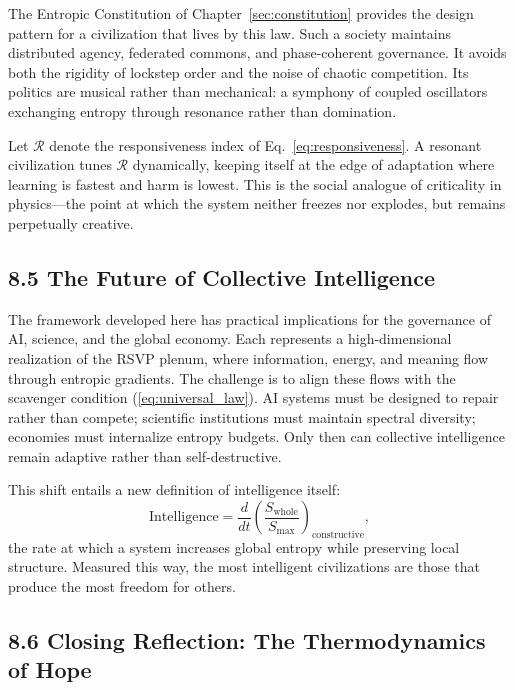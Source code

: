 \documentclass[11pt,a4paper,titlepage]{article}
\theoremstyle{definition}
\begin{document}
The Entropic Constitution of Chapter~\ref{sec:constitution} provides the 
design pattern for a civilization that lives by this law.  
Such a society maintains distributed agency, federated commons, and 
phase-coherent governance.
It avoids both the rigidity of lockstep order and the noise of chaotic 
competition.
Its politics are musical rather than mechanical:
a symphony of coupled oscillators exchanging entropy through resonance rather 
than domination.

Let $\mathcal{R}$ denote the responsiveness index of 
Eq.~\eqref{eq:responsiveness}.
A resonant civilization tunes $\mathcal{R}$ dynamically, keeping itself at the 
edge of adaptation where learning is fastest and harm is lowest.  
This is the social analogue of criticality in physics—the point at which the 
system neither freezes nor explodes, but remains perpetually creative.

\subsection{8.5 The Future of Collective Intelligence}

The framework developed here has practical implications for the governance of 
AI, science, and the global economy.
Each represents a high-dimensional realization of the RSVP plenum, where 
information, energy, and meaning flow through entropic gradients.  
The challenge is to align these flows with the scavenger condition 
(\ref{eq:universal_law}).  
AI systems must be designed to repair rather than compete;  
scientific institutions must maintain spectral diversity;  
economies must internalize entropy budgets.  
Only then can collective intelligence remain adaptive rather than 
self-destructive.

This shift entails a new definition of intelligence itself:
\begin{equation}
\text{Intelligence} = 
  \frac{d}{dt}\!\left(\frac{S_{\text{whole}}}{S_{\max}}\right)_{\!\!\text{constructive}},
\label{eq:intelligence}
\end{equation}
the rate at which a system increases global entropy while preserving local 
structure.
Measured this way, the most intelligent civilizations are those that produce 
the most freedom for others.

\subsection{8.6 Closing Reflection: The Thermodynamics of Hope}
\end{document}
